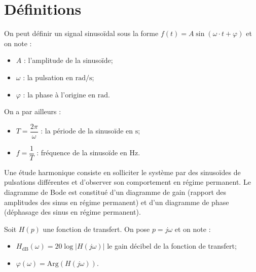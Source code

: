 \documentclass[10pt,fleqn]{article} %
\begin{document}

\vspace{2cm}
\pagestyle{fancy}
\thispagestyle{plain}

\section{Définitions}


On peut définir un signal sinusoïdal sous la forme $
f(t)=A \sin(\omega \cdot t + \varphi)
$ et on note :


\begin{minipage}[c]{.45\linewidth}
\begin{itemize}
\item $A$ : l'amplitude de la sinusoïde;
\item $\omega$ : la pulsation en $\text{rad/s}$;
\item $\varphi$ : la phase à l'origine en $\text{rad}$.
\end{itemize}
\end{minipage}\hfill
\begin{minipage}[c]{.45\linewidth}
On a par ailleurs :
\begin{itemize}
\item $T=\dfrac{2\pi}{\omega}$ : la période de la sinusoïde en $\text{s}$;
\item $f=\dfrac{1}{T}$ : fréquence de la sinusoïde en $\text{Hz}$.
\end{itemize}
\end{minipage}

Une étude harmonique consiste en solliciter le système par des sinusoïdes de pulsations différentes et d'observer son comportement en régime permanent. Le diagramme de Bode est constitué d'un diagramme de gain (rapport des amplitudes des sinus en régime permanent) et d'un diagramme de phase (déphasage des sinus en régime permanent). 

\begin{defi}
Soit $H(p)$ une fonction de transfert. On pose $p=j\omega$ et on note :  \begin{itemize}
\item $H_{\text{dB}}\left( \omega\right) =20\log |H(j\omega)|$ le gain décibel de la fonction de transfert;
\item $\varphi\left( \omega\right) = \text{Arg}\left(H(j\omega) \right)$.
\end{itemize}
\end{defi}
\end{document}
